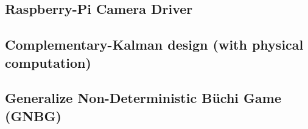 \documentclass[ twoside, 12pt ]{article}
\newcommand{\commentOut}[1]{}
\newcommand{\buchi}{B\"uchi }
\begin{document}
\subsection{Raspberry-Pi Camera Driver}
\subsection{Complementary-Kalman design (with physical computation)}
\subsection{Generalize Non-Deterministic \buchi Game (GNBG)}
\label{sec:GNBG}




\commentOut{
\section{Architecture: Automata Base Scheduler (From proposal)}

As describe in Section~\ref{sec:Problem} control systems have two main parts: \textit{state estimation} and \textit{controller}. 
The common used techniques for controllers, e.g PID, are relatively low resources consumers and there is no real justification of optimizing it, but this is not always the case for estimation process, some times there are heavy computational tasks as part of state estimation task, this refers to both the estimator and sensing stage.
The sensor can be complex computations of Global Positioning System (GPS) in small processor or even camera with heavy computer vision.
Those sensing task need to run in real-time and can interfere with rest of the system tasks.
In our architecture we concentrate more in those heavy sensing processes in order to improve the resource utilization and control performance.
(See~\ref{state estimation & why choose the window mission})

\commentOut{ %
    
}}
\end{document}
